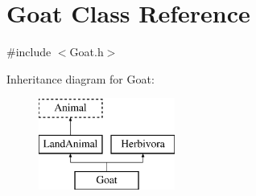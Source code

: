 \hypertarget{classGoat}{\section{Goat Class Reference}
\label{classGoat}
}


{\ttfamily \#include $<$Goat.\-h$>$}

Inheritance diagram for Goat\-:\begin{figure}[H]
\begin{center}
\leavevmode
\includegraphics[height=3.000000cm]{classGoat}
\end{center}
\end{figure}
